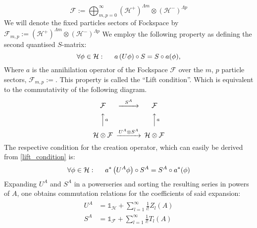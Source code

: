 \documentclass[a4paper,12pt]{article}
\begin{document}
\begin{equation}
\mathcal{F}:=\bigoplus_{m,p=0}^\infty \left(\mathcal{H}^+ \right)^{\Lambda m} \otimes \left(\mathcal{H}^- \right)^{\Lambda p}
\end{equation}
We will denote the fixed particles sectors of Fockspace by \(\mathcal{F}_{m,p}:= \left(\mathcal{H}^+ \right)^{\Lambda m} \otimes \left(\mathcal{H}^- \right)^{\Lambda p}\)
We employ the following property as defining the second quantised \(S\)-matrix:%
\begin{equation}\label{lift_condition}
\forall \phi\in \mathcal{H}: \hspace{0.5cm} a\left( U \phi \right)  \circ S= S \circ a(\phi),
\end{equation}
Where \(a\) is the annihilation operator of the Fockspace \(\mathcal{F}\) over the \(m\), \(p\) particle sectors, \(\mathcal{F}_{m,p}:=\). This property is called the ``Lift condition''. Which is equivalent to the commutativity of the following diagram.
\begin{equation}
\begin{CD}								%
\mathcal{F}     @>S^A>>  \mathcal{F}\\
@AAaA        @AAaA\\
\mathcal{H}\otimes \mathcal{F}     @>U^A\otimes S^A>>  \mathcal{H}\otimes \mathcal{F} 
\end{CD}
\end{equation}
The respective condition for the creation operator, which can easily be derived from \eqref{lift_condition} is:
\begin{equation}
\forall \phi\in \mathcal{H}: \hspace{0.5cm} a^*\left( U^A \phi \right)  \circ S^A =S^A \circ a^*(\phi)
\end{equation}
Expanding \(U^A\) and \(S^A\) in a powerseries and sorting the resulting series in powers of \(A\), one obtains commutation relations for the coefficients of said expansion:
\begin{multline}
\begin{aligned}
U^A&=\mathds{1}_\mathcal{H}+\sum_{l=1}^\infty \frac{1}{l!} Z_l (A)\\
S^A&=\mathds{1}_\mathcal{F}+\sum_{l=1}^\infty \frac{1}{l!} T_l(A)
\end{aligned}
\end{multline}
\end{document}
